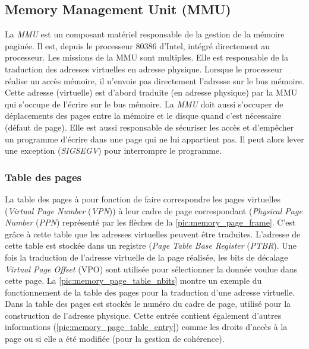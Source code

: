 \subsection{Memory Management Unit (MMU)} \label{sec:mmu}
La \textit{MMU} est un composant matériel responsable de la gestion de la mémoire paginée. Il est, depuis le processeur 80386 d'Intel, intégré directement au processeur. Les missions de la MMU sont multiples. Elle est responsable de la traduction des adresses virtuelles en adresse physique. Lorsque le processeur réalise un accès mémoire, il n'envoie pas directement l'adresse sur le bus mémoire. Cette adresse (virtuelle) est d'abord traduite (en adresse physique) par la MMU qui s'occupe de l'écrire sur le bus mémoire. La \textit{MMU} doit aussi s'occuper de déplacements des pages entre la mémoire et le disque quand c'est nécessaire (défaut de page). Elle est aussi responsable de sécuriser les accès et d'empêcher un programme d'écrire dans une page qui ne lui appartient pas. Il peut alors lever une exception (\textit{SIGSEGV}) pour interrompre le programme. 

\subsubsection{Table des pages} \label{sec:table_page}
La table des pages à pour fonction de faire correspondre les pages virtuelles (\textit{Virtual Page Number} (\textit{VPN})) à leur cadre de page correspondant (\textit{Physical Page Number} (\textit{PPN}) représenté par les flèches de la \autoref{pic:memory_page_frame}. C'est grâce à cette table que les adresses virtuelles peuvent être traduites. L'adresse de cette table est stockée dans un registre (\textit{Page Table Base Register} (\textit{PTBR}). Une fois la traduction de l'adresse virtuelle de la page réalisée, les bits de décalage \textit{Virtual Page Offset} (VPO) sont utilisée pour sélectionner la donnée voulue dans cette page. La \autoref{pic:memory_page_table_nbits} montre un exemple du fonctionnement de la table des pages pour la traduction d'une adresse virtuelle. Dans la table des pages est stockés le numéro du cadre de page, utilisé pour la construction de l'adresse physique. Cette entrée contient également d'autres informations (\autoref{pic:memory_page_table_entry}) comme les droits d'accès à la page ou si elle a été modifiée (pour la gestion de cohérence).

